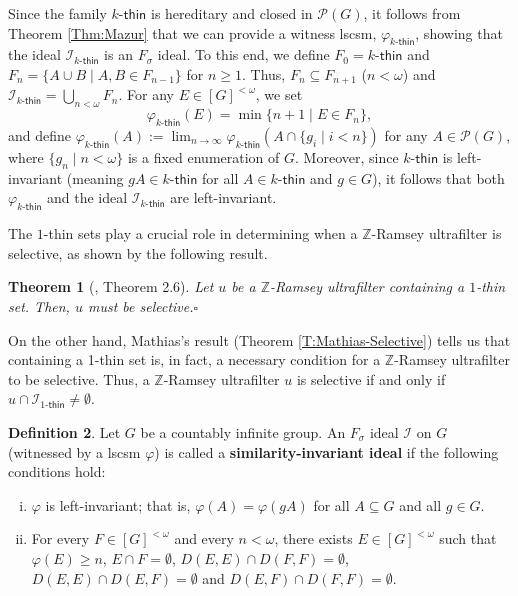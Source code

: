 \documentclass{amsart}
\newtheorem{theorem}{Theorem}[section]
\theoremstyle{definition}
\newtheorem{definition}[theorem]{Definition}
\theoremstyle{remark}
\numberwithin{equation}{section}
\newcommand{\onethin}{1\text{-}\mathsf{thin}}
\begin{document}
Since the family $\text{$k$-$\mathsf{thin}$}$ is hereditary and closed in $\mathcal{P}(G)$, it follows from Theorem \ref{Thm:Mazur} that we can provide a witness lscsm, $\varphi_{\text{$k$-$\mathsf{thin}$}}$, showing that the ideal $\mathcal{I}_{\text{$k$-$\mathsf{thin}$}}$ is an $F_{\sigma}$ ideal. To this end, we define  $F_{0}=\text{$k$-$\mathsf{thin}$}$ and $F_{n}=\{A \cup B \mid  A, B \in F_{n-1}\}$ for 
$n \geq 1$. Thus, $F_{n} \subseteq F_{n+1}$ ($n<\omega$) and $\mathcal{I}_{\text{$k$-$\mathsf{thin}$}} = \bigcup_{n < \omega} F_{n}$. For any $E \in [G]^{<\omega}$, we set  
\[
\varphi_{\text{$k$-$\mathsf{thin}$}}(E)= \min \{n +1 \mid  E \in F_{n}\},
\]
and define $\varphi_{\text{$k$-$\mathsf{thin}$}}(A) :=\lim_{n \to \infty} \varphi_{\text{$k$-$\mathsf{thin}$}}(A \cap \{g_{i} \mid  i < n\})$ for any $A \in \mathcal{P}(G)$, where $\{g_{n} \mid  n < \omega\}$ is a fixed enumeration of $G$. Moreover, since $\text{$k$-$\mathsf{thin}$}$ is left-invariant (meaning $g A \in \text{$k$-$\mathsf{thin}$}$ for all $A \in \text{$k$-$\mathsf{thin}$}$ and $g \in G$), it follows that both $\varphi_{\text{$k$-$\mathsf{thin}$}}$ and the ideal $\mathcal{I}_{\text{$k$-$\mathsf{thin}$}}$ are left-invariant. 

\medskip

The $1$-thin sets play a crucial role in determining when a $\mathbb{Z}$-Ramsey ultrafilter is selective, as shown by the following result.


\begin{theorem}[\cite{MR3376354}, Theorem 2.6]\label{Zramsey+thinset-implica-ramsey}
Let $u$ be a $\mathbb Z$-Ramsey ultrafilter containing a $1$-thin set. Then, $u$ must be selective.\hfill $\square$
\end{theorem}

On the other hand, Mathias's result (Theorem \ref{T:Mathias-Selective}) tells us that containing a 1-thin set is, in fact, a necessary condition for a $\mathbb{Z}$-Ramsey ultrafilter to be selective. Thus, a $\mathbb{Z}$-Ramsey ultrafilter $u$ is selective if and only if $u \cap \mathcal{I}_{\onethin} \ne \emptyset$.

\begin{definition}\label{Def-SimInvIdeal}
    Let $G$ be a countably infinite group. An $F_{\sigma}$ ideal $\mathcal{I}$ on $G$ (witnessed by a lscsm $\varphi$) is called a {\bf similarity-invariant ideal} if the following conditions hold:
    \begin{enumerate}[(i)]
        \item $\varphi$ is left-invariant; that is, $\varphi(A)=\varphi(g A)$ for all $A \subseteq G$ and all $g \in G$.
        \item For every $F \in [G]^{<\omega}$ and every $n < \omega$, there exists $E \in [G]^{<\omega}$ such that $\varphi(E) \geq n$, $E \cap F = \emptyset$, $D(E,E) \cap D(F,F) = \emptyset$, $D(E,E) \cap D(E,F) = \emptyset$ and $D(E,F) \cap D(F,F) = \emptyset$.     
    \end{enumerate}
\end{definition}
\end{document}
